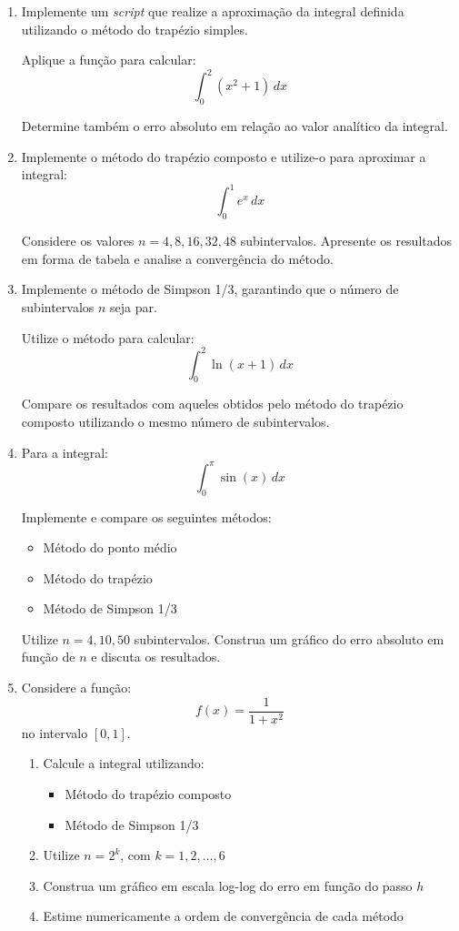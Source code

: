 \begin{enumerate}
\section{Integração Numérica}\label{sec:integração}
\item Implemente um \textit{script} que realize a aproximação da integral definida utilizando o método do trapézio simples.

Aplique a função para calcular:
\[
\int_{0}^{2} (x^2 + 1)\,dx
\]

Determine também o erro absoluto em relação ao valor analítico da integral.

\item Implemente o método do trapézio composto e utilize-o para aproximar a integral:
\[
\int_{0}^{1} e^x \, dx
\]

Considere os valores $n = 4, 8, 16, 32, 48$ subintervalos. Apresente os resultados em forma de tabela e analise a convergência do método.

\item Implemente o método de Simpson 1/3, garantindo que o número de subintervalos $n$ seja par.

Utilize o método para calcular:
\[
\int_{0}^{2} \ln(x+1)\,dx
\]

Compare os resultados com aqueles obtidos pelo método do trapézio composto utilizando o mesmo número de subintervalos.

\item Para a integral:
\[
\int_{0}^{\pi} \sin(x)\,dx
\]

Implemente e compare os seguintes métodos:
\begin{itemize}
    \item Método do ponto médio
    \item Método do trapézio
    \item Método de Simpson 1/3
\end{itemize}

Utilize $n = 4, 10, 50$ subintervalos. Construa um gráfico do erro absoluto em função de $n$ e discuta os resultados.

\item Considere a função:
\[
f(x) = \frac{1}{1 + x^2}
\]
no intervalo $[0,1]$.

\begin{enumerate}
    \item Calcule a integral utilizando:
    \begin{itemize}
        \item Método do trapézio composto
        \item Método de Simpson 1/3
    \end{itemize}
    \item Utilize $n = 2^k$, com $k = 1, 2, \dots, 6$
    \item Construa um gráfico em escala log-log do erro em função do passo $h$
    \item Estime numericamente a ordem de convergência de cada método
\end{enumerate}



\end{enumerate}
